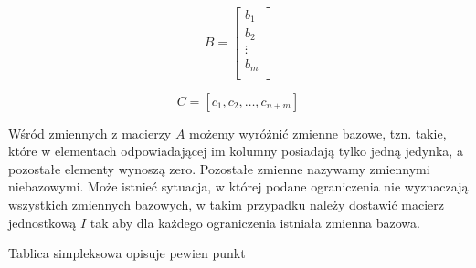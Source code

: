 \documentclass{classrep}
\begin{document}
\begin{equation}
  B = \left[ \begin{array}{c}
		b_1 \\
		b_2 \\
		\vdots \\
		b_m \\
             \end{array}
      \right]
\end{equation}

\begin{equation}
  C = \left[c_1, c_2, \ldots, c_{n+m} \right]
\end{equation}

Wśród zmiennych z macierzy $A$ możemy wyróżnić zmienne bazowe, tzn. takie, które w elementach odpowiadającej im kolumny posiadają tylko jedną jedynka, a pozostałe elementy wynoszą zero. Pozostałe zmienne nazywamy zmiennymi niebazowymi. Może istnieć sytuacja, w której podane ograniczenia nie wyznaczają wszystkich zmiennych bazowych, w takim przypadku należy dostawić macierz jednostkową $I$ tak aby dla każdego ograniczenia istniała zmienna bazowa.

Tablica simpleksowa opisuje pewien punkt 
\end{document}
